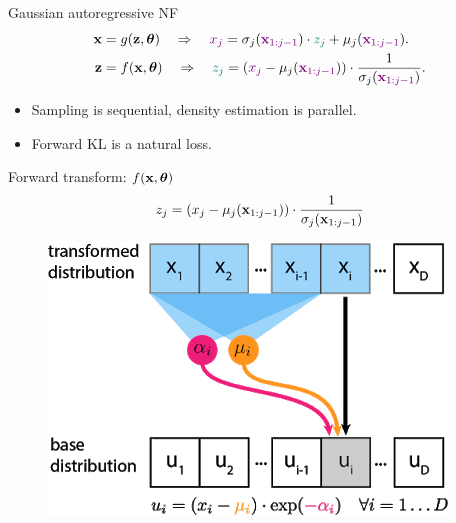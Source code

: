\begin{frame}{Gaussian autoregressive NF}
	\vspace{-0.5cm}
	\begin{align*}
		\mathbf{x} &= g(\mathbf{z}, \boldsymbol{\theta}) \quad \Rightarrow \quad {\color{violet} x_j} = \sigma_j ({\color{violet} \mathbf{x}_{1:j-1}}) \cdot {\color{teal} z_j} + \mu_j({\color{violet} \mathbf{x}_{1:j-1}}). \\
		\mathbf{z} &= f(\mathbf{x}, \boldsymbol{\theta}) \quad \Rightarrow \quad {\color{teal} z_j} = \left({\color{violet}x_j} - \mu_j({\color{violet}\mathbf{x}_{1:j-1}}) \right) \cdot \frac{1}{ \sigma_j ({\color{violet}\mathbf{x}_{1:j-1}})}.
	\end{align*}
	
	\begin{itemize}
		\item Sampling is sequential, density estimation is parallel.
		\item Forward KL is a natural loss.
	\end{itemize}
	\vspace{-0.3cm}
	
	\begin{minipage}[t]{0.65\columnwidth}
		\begin{block}{Forward transform: $f(\mathbf{x}, \boldsymbol{\theta})$}
			\[
				z_j = (x_j - \mu_j(\mathbf{x}_{1:j-1})) \cdot \frac{1}{\sigma_j (\mathbf{x}_{1:j-1}) }
			\]
			\vspace{-0.4cm}
		\end{block}
	\end{minipage}%
	\begin{minipage}[t]{0.35\columnwidth}
		\begin{figure}[h]
			\centering
			\includegraphics[width=.9\linewidth]{figs/af_iaf_explained_2.png}
		\end{figure}
	\end{minipage} \\
	

\end{frame}
